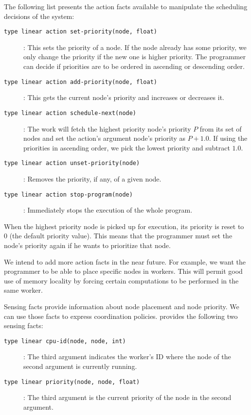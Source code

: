 The following list presents the action facts available to manipulate the scheduling decisions of the system:

\begin{description}
   \item[\texttt{type linear action set-priority(node, float)}]: This sets the priority of a node. If the node already has some priority, we only change the priority if the new one is higher priority. The programmer can decide if priorities are to be ordered in ascending or descending order.
   \item[\texttt{type linear action add-priority(node, float)}]: This gets the current node's priority and increases or decreases it.
   \item[\texttt{type linear action schedule-next(node)}]: The work will fetch the highest priority node's priority $P$ from its set of nodes and set the action's argument node's priority as $P + 1.0$. If using the priorities
   in ascending order, we pick the lowest priority and subtract $1.0$.
   \item[\texttt{type linear action unset-priority(node)}]: Removes the priority, if any, of a given node.
   \item[\texttt{type linear action stop-program(node)}]: Immediately stops the execution of the whole program.
\end{description}

When the highest priority node is picked up for execution, its priority is reset to 0 (the default priority value). This means that
the programmer must set the node's priority again if he wants to prioritize that node.

We intend to add more action facts in the near future. For example, we want the programmer to be able to place specific nodes in workers. This will permit good use of
memory locality by forcing certain computations to be performed in the same worker.

Sensing facts provide information about node placement and node priority. We can use those facts
to express coordination policies. \lang provides the following two
sensing facts:

\begin{description}
   \item[\texttt{type linear cpu-id(node, node, int)}]: The third argument indicates the worker's ID where the node of the second argument is currently running.
   \item[\texttt{type linear priority(node, node, float)}]: The third argument is the current priority of the node in the second argument.
\end{description}

